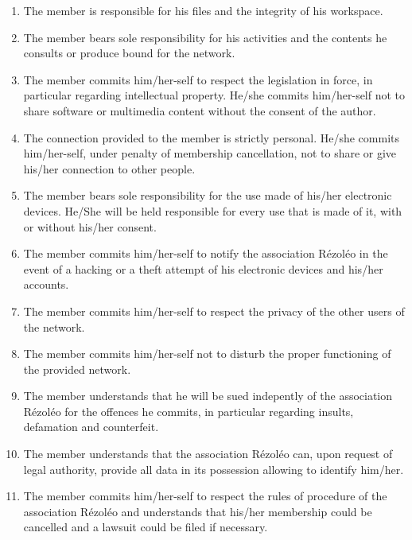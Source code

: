 \documentclass[12pt]{article}
\begin{document}
\begin{enumerate}[leftmargin=*]

\item The member is responsible for his files and the integrity of his workspace.

\item The member bears sole responsibility for his activities and the contents he consults or produce bound for
the network.

\item The member commits him/her-self to respect the legislation in force, in particular regarding intellectual
property. He/she commits him/her-self not to share software or multimedia content without the consent of the
author.

\item The connection provided to the member is strictly personal. He/she commits him/her-self, under penalty of
membership cancellation, not to share or give his/her connection to other people.

\item The member bears sole responsibility for the use made of his/her electronic devices. He/She will be held
responsible for every use that is made of it, with or without his/her consent.

\item The member commits him/her-self to notify the association Rézoléo in the event of a hacking or a theft
attempt of his electronic devices and his/her accounts.

\item The member commits him/her-self to respect the privacy of the other users of the network.

\item The member commits him/her-self not to disturb the proper functioning of the provided network.

\item The member understands that he will be sued indepently of the association Rézoléo for the offences he
commits, in particular regarding insults, defamation and counterfeit.

\item The member understands that the association Rézoléo can, upon request of legal authority, provide all
data in its possession allowing to identify him/her.

\item The member commits him/her-self to respect the rules of procedure of the association Rézoléo and
understands that his/her membership could be cancelled and a lawsuit could be filed if necessary.

\end{enumerate}
\end{document}
